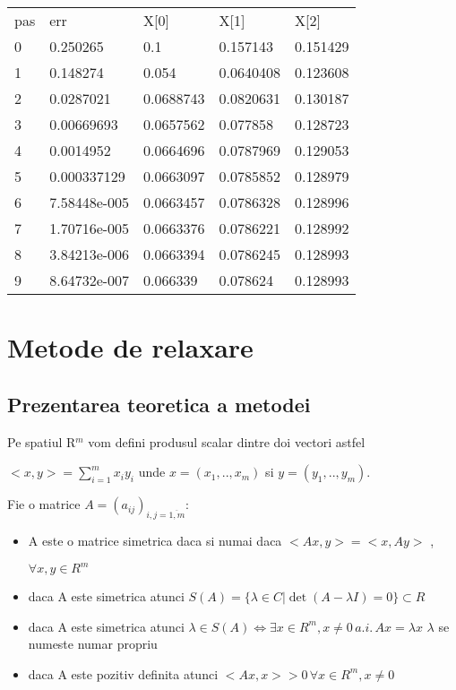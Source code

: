 \documentclass[a4paper,twoside]{book}
\begin{document}
\begin{tabular}{lllll}
pas & err & X[0] & X[1] & X[2] \\ 
0 & 0.250265 & 0.1 & 0.157143 & 0.151429 \\ 
1 & 0.148274 & 0.054 & 0.0640408 & 0.123608 \\ 
2 & 0.0287021 & 0.0688743 & 0.0820631 & 0.130187 \\ 
3 & 0.00669693 & 0.0657562 & 0.077858 & 0.128723 \\ 
4 & 0.0014952 & 0.0664696 & 0.0787969 & 0.129053 \\ 
5 & 0.000337129 & 0.0663097 & 0.0785852 & 0.128979 \\ 
6 & 7.58448e-005 & 0.0663457 & 0.0786328 & 0.128996 \\ 
7 & 1.70716e-005 & 0.0663376 & 0.0786221 & 0.128992 \\ 
8 & 3.84213e-006 & 0.0663394 & 0.0786245 & 0.128993 \\ 
9 & 8.64732e-007 & 0.066339 & 0.078624 & 0.128993%
\end{tabular}

\chapter{Metode de relaxare}

\section{Prezentarea teoretica a metodei}

Pe spatiul R$^{m}$ vom defini produsul scalar dintre doi vectori astfel

$<x,y>=\sum_{i=1}^{m}x_{i}y_{i}$ unde $x=(x_{1},..,x_{m})$ si $%
y=(y_{1},..,y_{m})$.

Fie o matrice $A=(a_{ij})_{i,j=\overline{1,m}}$:

\begin{itemize}
\item A este o matrice simetrica daca si numai daca $<Ax,y>=<x,Ay>$%
\thinspace ,

$\forall x,y\in R^{m}$

\item daca A este simetrica atunci $S(A)=\{\lambda \in C|\det (A-\lambda
I)=0\}\subset R$

\item daca A este simetrica atunci $\lambda \in S(A)\Leftrightarrow \exists
x\in R^{m},x\neq 0\,a.i.\,Ax=\lambda x$ $\lambda $ se numeste numar propriu

\item daca A este pozitiv definita atunci $<Ax,x>>0\,\forall x\in
R^{m},x\neq 0$
\end{itemize}
\end{document}
